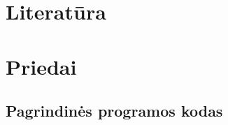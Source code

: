 \documentclass[10pt,a4paper,twocolumn]{article}
\begin{document}
\section*{Literatūra}

\renewcommand\refname{}
\vspace*{-24pt}
\makeatother

\section*{Priedai}

\subsection*{Pagrindinės programos kodas}
\onecolumn
\end{document}
